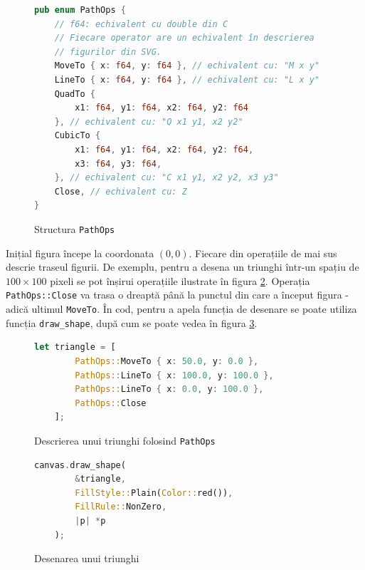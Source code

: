 \documentclass[a4paper, 12pt]{report}
\begin{document}
\begin{figure}[ht]
    \centering
    \begin{lstlisting}[language=Rust]
pub enum PathOps {
    // f64: echivalent cu double din C
    // Fiecare operator are un echivalent în descrierea
    // figurilor din SVG.
    MoveTo { x: f64, y: f64 }, // echivalent cu: "M x y"
    LineTo { x: f64, y: f64 }, // echivalent cu: "L x y"
    QuadTo {
        x1: f64, y1: f64, x2: f64, y2: f64
    }, // echivalent cu: "Q x1 y1, x2 y2"
    CubicTo {
        x1: f64, y1: f64, x2: f64, y2: f64,
        x3: f64, y3: f64,
    }, // echivalent cu: "C x1 y1, x2 y2, x3 y3"
    Close, // echivalent cu: Z
}
    \end{lstlisting}
    \caption{Structura \texttt{PathOps}}
    \label{fig-enum-pathops}
\end{figure}

Inițial figura începe la coordonata \((0, 0)\). Fiecare din operațiile de mai sus descrie traseul figurii. De exemplu, pentru a desena
un triunghi într-un spațiu de \(100 \times 100\) pixeli se pot înșirui operațiile ilustrate în figura \ref{fig-descrierea-unui-triunghi}.
Operația \texttt{PathOps::Close} va trasa o dreaptă până la punctul din care a început figura - adică ultimul \texttt{MoveTo}. În cod,
pentru a apela funcția de desenare se poate utiliza funcția \texttt{draw\_shape}, după cum se poate vedea în figura \ref{fig-desenarea-unui-triunghi}.

\begin{figure}[ht]
    \centering
    \begin{lstlisting}[language=Rust]
    let triangle = [
        PathOps::MoveTo { x: 50.0, y: 0.0 },
        PathOps::LineTo { x: 100.0, y: 100.0 },
        PathOps::LineTo { x: 0.0, y: 100.0 },
        PathOps::Close
    ];
    \end{lstlisting}
    \caption{Descrierea unui triunghi folosind \texttt{PathOps}}
    \label{fig-descrierea-unui-triunghi}
\end{figure}

\begin{figure}[ht]
    \centering
    \begin{lstlisting}[language=Rust]
    canvas.draw_shape(
        &triangle,
        FillStyle::Plain(Color::red()),
        FillRule::NonZero,
        |p| *p
    );
    \end{lstlisting}
    \caption{Desenarea unui triunghi}
    \label{fig-desenarea-unui-triunghi}
\end{figure}
\end{document}
